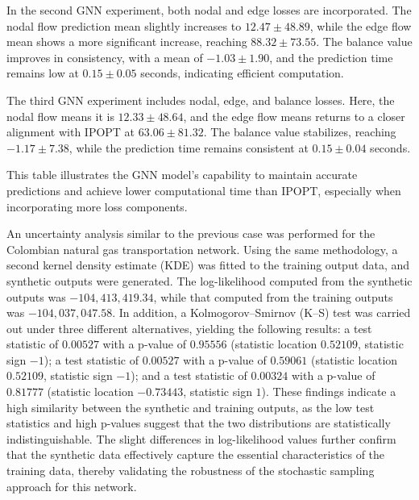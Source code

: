 In the second GNN experiment, both nodal and edge losses are incorporated. The nodal flow prediction mean slightly increases to \( 12.47 \pm 48.89 \), while the edge flow mean shows a more significant increase, reaching \( 88.32 \pm 73.55 \). The balance value improves in consistency, with a mean of \( -1.03 \pm 1.90 \), and the prediction time remains low at \( 0.15 \pm 0.05 \) seconds, indicating efficient computation.

The third GNN experiment includes nodal, edge, and balance losses. Here, the nodal flow means it is \( 12.33 \pm 48.64 \), and the edge flow means returns to a closer alignment with IPOPT at \( 63.06 \pm 81.32 \). The balance value stabilizes, reaching \( -1.17 \pm 7.38 \), while the prediction time remains consistent at \( 0.15 \pm 0.04 \) seconds.

This table illustrates the GNN model's capability to maintain accurate predictions and achieve lower computational time than IPOPT, especially when incorporating more loss components.




An uncertainty analysis similar to the previous case was performed for the Colombian natural gas transportation network. Using the same methodology, a second kernel density estimate (KDE) was fitted to the training output data, and synthetic outputs were generated. The log-likelihood computed from the synthetic outputs was \(-104,413,419.34\), while that computed from the training outputs was \(-104,037,047.58\). In addition, a Kolmogorov–Smirnov (K–S) test was carried out under three different alternatives, yielding the following results: a test statistic of \(0.00527\) with a p-value of \(0.95556\) (statistic location \(0.52109\), statistic sign \(-1\)); a test statistic of \(0.00527\) with a p-value of \(0.59061\) (statistic location \(0.52109\), statistic sign \(-1\)); and a test statistic of \(0.00324\) with a p-value of \(0.81777\) (statistic location \(-0.73443\), statistic sign \(1\)). These findings indicate a high similarity between the synthetic and training outputs, as the low test statistics and high p-values suggest that the two distributions are statistically indistinguishable. The slight differences in log-likelihood values further confirm that the synthetic data effectively capture the essential characteristics of the training data, thereby validating the robustness of the stochastic sampling approach for this network.







